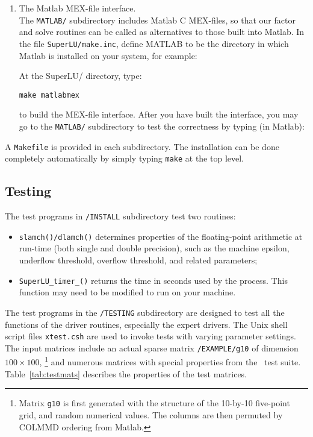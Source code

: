 \begin{enumerate}
\item The Matlab MEX-file interface.\\
   The {\tt MATLAB/} subdirectory includes Matlab C MEX-files, so that 
   our factor and solve routines can be called as alternatives to those
   built into Matlab. In the file {\tt SuperLU/make.inc}, 
   define MATLAB to be the 
   directory in which Matlab is installed on your system, for example:

   \hspace{.4in}{\tt MATLAB = /usr/local/matlab}

   At the SuperLU/ directory, type:

   \hspace{.4in} {\tt make matlabmex} 

   to build the MEX-file
   interface. After you have built the interface, you may go to the 
   {\tt MATLAB/} subdirectory to test the correctness by typing (in Matlab):
   
   \hspace{.4in}{\tt trysuperlu}

   \hspace{.4in}{\tt trylusolve}

\end{enumerate}


A {\tt Makefile} is provided in each subdirectory.
The installation can be done completely automatically by simply 
typing {\tt make} at the top level.

\subsection{Testing}
The test programs in {\tt \superlu/INSTALL} subdirectory test two routines:
\begin{itemize}
\item {\tt slamch()/dlamch()} determines properties of the floating-point
      arithmetic at run-time (both single and double precision), such as
      the machine epsilon, underflow threshold, overflow threshold, 
      and related parameters;
\item {\tt SuperLU\_timer\_()} returns the time in seconds used by the
      process. This function may need to be modified to run on your machine.
\end{itemize}

The test programs in the {\tt \superlu/TESTING} subdirectory are designed to 
test all the functions of the driver routines, especially the expert drivers.
The Unix shell script files {\tt xtest.csh} are used to invoke tests
with varying parameter settings. The input matrices include an actual 
sparse matrix {\tt \superlu/EXAMPLE/g10} of dimension $100\times 100$,%
\footnote{Matrix {\tt g10} is first generated with the structure of
the 10-by-10 five-point grid, and random numerical values. The
columns are then permuted by COLMMD ordering from Matlab.}
and numerous matrices with special properties from the \LAPACK\ test suite. 
Table~\ref{tab:testmats} describes the properties of the test matrices.

